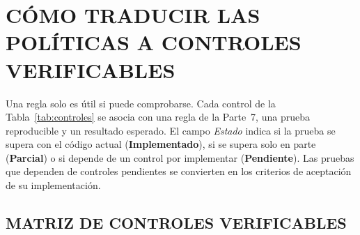 \documentclass[12pt,letterpaper]{article}
\newcommand{\Si}{\textcolor{green!40!black}{\textbf{Implementado}}}
\newcommand{\Pa}{\textcolor{orange!80!black}{\textbf{Parcial}}}
\newcommand{\No}{\textcolor{red!70!black}{\textbf{Pendiente}}}
\begin{document}
\section{CÓMO TRADUCIR LAS POLÍTICAS A CONTROLES VERIFICABLES}

Una regla solo es útil si puede comprobarse. Cada control de la Tabla~\ref{tab:controles} se asocia con una regla de la Parte~7, una prueba reproducible y un resultado esperado. El campo \emph{Estado} indica si la prueba se supera con el código actual (\Si), si se supera solo en parte (\Pa) o si depende de un control por implementar (\No). Las pruebas que dependen de controles pendientes se convierten en los criterios de aceptación de su implementación.

\subsection{MATRIZ DE CONTROLES VERIFICABLES}
\end{document}
